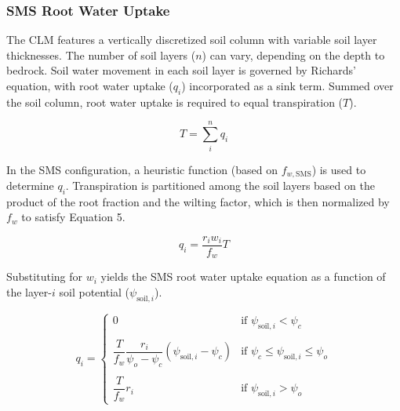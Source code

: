 \documentclass[draft,linenumbers]{agujournal}
\begin{document}
\subsubsection{SMS Root Water Uptake}
\label{sect:smsrwu}
    The CLM features a vertically discretized soil column with variable soil layer thicknesses.
    The number of soil layers ($n$) can vary, depending on the depth to bedrock.
    Soil water movement in each soil layer is governed by Richards' equation, with root water uptake ($q_i$) incorporated as a sink term.
    Summed over the soil column, root water uptake is required to equal transpiration ($T$).

    \begin{linenomath*}
    \begin{equation}
    T = \sum^n_i{q_i}
    \end{equation}
    \end{linenomath*} 
    
    In the SMS configuration, a heuristic function (based on $f_{w,\text{SMS}}$) is used to determine $q_i$.
    Transpiration is partitioned among the soil layers based on the product of the root fraction and the wilting factor, which is then normalized by $f_w$ to satisfy Equation 5.
    \begin{linenomath*}
    \begin{equation}
    \label{bt:4}
    q_i = \dfrac{r_i w_i}{f_w}T
    \end{equation}
    \end{linenomath*}
    
    Substituting for $w_i$ yields the SMS root water uptake equation as a function of the layer-$i$ soil potential ($\psi_{\text{soil},i}$).
    
    \begin{linenomath*}
    \begin{equation}
    q_i =
    \begin{cases}
    \label{eq:btrwu}
    0    & \text{if } \psi_{\text{soil},i}<\psi_{c}  \\
    \\[1pt]
        \dfrac{T}{f_w} \dfrac{r_i}{\psi_{o}-\psi_{c}} \left(\psi_{\text{soil},i}-\psi_{c} \right)     & \text{if } \psi_{c} \le \psi_{\text{soil},i} \le \psi_{o} \\
    \\[1pt]
    \dfrac{T}{f_w} r_i    & \text{if } \psi_{\text{soil},i} > \psi_{o}
    \end{cases}
    \end{equation}
    \end{linenomath*}
    
\end{document}
